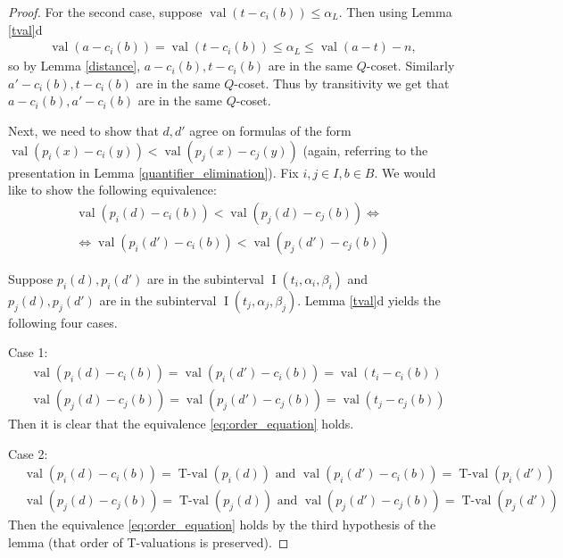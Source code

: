\documentclass{amsart}
\DeclareMathOperator{\val}{val}
\DeclareMathOperator{\vval}{val}
\DeclareMathOperator{\tval}{T-val}
\DeclareMathOperator{\inti}{I}
\begin{document}
\begin{proof}
  For the second case, suppose $\val(t - c_i(b)) \leq \alpha_L$.
  Then using Lemma \ref{tval}d
  \begin{align*}
    \val(a - c_i(b)) = \val(t - c_i(b)) \leq \alpha_L \leq \val(a - t) - n,
  \end{align*}
  so by Lemma \ref{distance}, $a - c_i(b), t - c_i(b)$ are in the same $Q$-coset.
  Similarly $a' - c_i(b), t - c_i(b)$ are in the same $Q$-coset.
  Thus by transitivity we get that $a - c_i(b), a' - c_i(b)$ are in the same $Q$-coset.

  Next, we need to show that $d, d'$ agree on formulas of the form
  $\vval (p_i(x) - c_i(y)) < \vval (p_j(x) - c_j(y))$ 
  (again, referring to the presentation in Lemma \ref{quantifier_elimination}).
  Fix $i,j \in I, b \in B$.
  We would like to show the following equivalence: 
  \begin{multline} \label {eq:order_equation}
    \vval (p_i(d) - c_i(b)) < \vval (p_j(d) - c_j(b)) \iff \\
    \iff \vval (p_i(d') - c_i(b)) < \vval (p_j(d') - c_j(b))
  \end{multline}

  Suppose $p_i(d), p_i(d')$ are in the subinterval $\inti(t_i, \alpha_i, \beta_i)$ and 
  $p_j(d), p_j(d')$ are in the subinterval $\inti(t_j, \alpha_j, \beta_j)$.
  Lemma \ref{tval}d yields the following four cases.

  Case 1:
  \begin{align*}
    &\vval (p_i(d) - c_i(b)) = \vval (p_i(d') - c_i(b)) = \vval(t_i - c_i(b)) \\
    &\vval (p_j(d) - c_j(b)) = \vval (p_j(d') - c_j(b)) = \vval(t_j - c_j(b))
  \end{align*}
  Then it is clear that the equivalence \eqref{eq:order_equation} holds.

  Case 2:
  \begin{align*}
    &\vval (p_i(d) - c_i(b)) = \tval(p_i(d)) \text{ and } \vval (p_i(d') - c_i(b)) = \tval(p_i(d')) \\
    &\vval (p_j(d) - c_j(b)) = \tval(p_j(d)) \text{ and } \vval (p_j(d') - c_j(b)) = \tval(p_j(d'))
  \end{align*}
  Then the equivalence \eqref{eq:order_equation} holds by the third hypothesis of the lemma (that order of T-valuations is preserved).


\end{proof}
\end{document}
